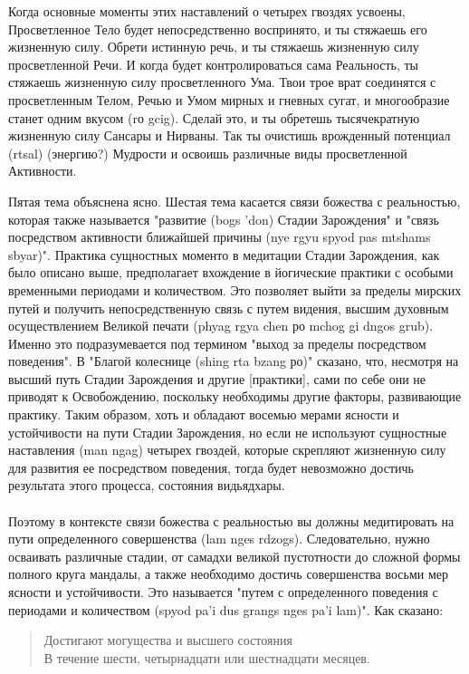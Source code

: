 Когда основные моменты этих наставлений о четырех гвоздях усвоены,
Просветленное Тело будет непосредственно воспринято, и ты стяжаешь его жизненную
силу. Обрети истинную речь, и ты стяжаешь жизненную силу просветленной Речи. И когда
будет контролироваться сама Реальность, ты стяжаешь жизненную силу просветленного
Ума. Твои трое врат соединятся с просветленным Телом, Речью и Умом мирных и гневных
сугат, и многообразие станет одним вкусом (rо gcig). Сделай это, и ты обретешь
тысячекратную жизненную силу Сансары и Нирваны. Так ты очистишь врожденный
потенциал (rtsal) (энергию?) Мудрости и освоишь различные виды просветленной
Активности.

\begin{siderules}
Пятая тема объяснена ясно. Шестая тема касается связи божества с реальностью, которая
также называется "развитие (bogs 'don) Стадии Зарождения" и "связь посредством
активности ближайшей причины (nye rgyu spyod pas mtshams sbyar)". Практика сущностных
моменто в медитации Стадии Зарождения, как было описано выше, предполагает вхождение
в йогические практики с особыми временными периодами и количеством. Это позволяет
выйти за пределы мирских путей и получить непосредственную связь с путем видения,
высшим духовным осуществлением Великой печати (phyag rgya chen ро mchog gi dngos grub).
Именно это подразумевается под термином "выход за пределы посредством поведения".
В "Благой колеснице (shing rta bzang ро)" сказано, что, несмотря на высший путь Стадии
Зарождения и другие [практики], сами по себе они не приводят к Освобождению, поскольку
необходимы другие факторы, развивающие практику. Таким образом, хоть и обладают
восемью мерами ясности и устойчивости на пути Стадии Зарождения, но если не используют
сущностные наставления (man ngag) четырех гвоздей, которые скрепляют жизненную силу
для развития ее посредством поведения, тогда будет невозможно достичь результата этого
процесса, состояния видьядхары.\\
\\
Поэтому в контексте связи божества с реальностью вы должны медитировать на пути
определенного совершенства (lam nges rdzogs). Следовательно, нужно осваивать различные
стадии, от самадхи великой пустотности до сложной формы полного круга мандалы, а также
необходимо достичь совершенства восьми мер ясности и устойчивости. Это называется
"путем с определенного поведения с периодами и количеством (spyod pa'i dus grangs nges pa'i lam)".
Как сказано:

\begin{verse}
Достигают могущества и высшего состояния\\
В течение шести, четырнадцати или шестнадцати месяцев.\\
\end{verse}


\end{siderules}
